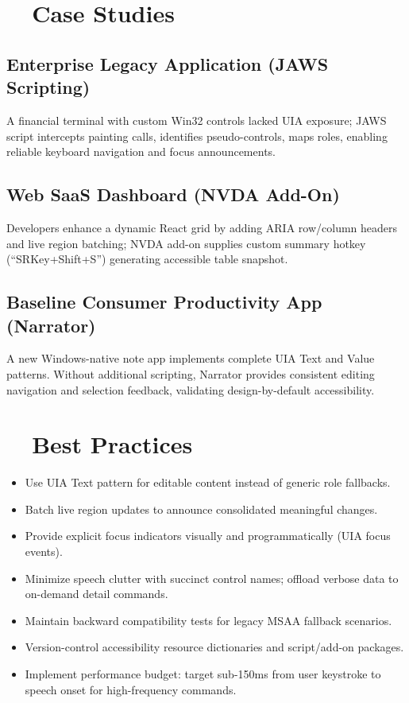 \section{~~Case Studies}
\label{sec:sr-case-studies}
\subsection*{Enterprise Legacy Application (JAWS Scripting)}
A financial terminal with custom Win32 controls lacked UIA exposure; JAWS script intercepts painting calls, identifies pseudo-controls, maps roles, enabling reliable keyboard navigation and focus announcements.

\subsection*{Web SaaS Dashboard (NVDA Add-On)}
Developers enhance a dynamic React grid by adding ARIA row/column headers and live region batching; NVDA add-on supplies custom summary hotkey (“SRKey+Shift+S”) generating accessible table snapshot.

\subsection*{Baseline Consumer Productivity App (Narrator)}
A new Windows-native note app implements complete UIA Text and Value patterns. Without additional scripting, Narrator provides consistent editing navigation and selection feedback, validating design-by-default accessibility.

\section{~~Best Practices}
\label{sec:sr-best-practices}
\begin{itemize}
	\item Use UIA Text pattern for editable content instead of generic role fallbacks.
	\item Batch live region updates to announce consolidated meaningful changes.
	\item Provide explicit focus indicators visually and programmatically (UIA focus events).
	\item Minimize speech clutter with succinct control names; offload verbose data to on-demand detail commands.
	\item Maintain backward compatibility tests for legacy MSAA fallback scenarios.
	\item Version-control accessibility resource dictionaries and script/add-on packages.
	\item Implement performance budget: target sub-150ms from user keystroke to speech onset for high-frequency commands.
\end{itemize}

